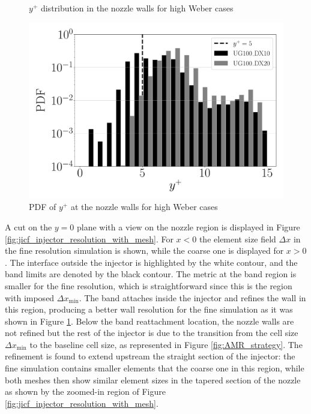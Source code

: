 \begin{figure}[ht]
\centering
{}
\caption{$y^+$ distribution in the nozzle walls for high Weber cases}
\label{fig:injector_visualization_y_plus}
\end{figure}

\begin{figure}[ht]
	\centering
   \includegraphics[scale=0.20]{./part2_developments/figures_ch5_resolved_JICF/instabilities_resolution/y_plus_injector}
   \vspace{-0.15in}
   \caption{PDF of $y^+$ at the nozzle walls for high Weber cases}
   \label{fig:jicf_nozzle_y_plus_PDF}
\end{figure}



A cut on the $y = 0$ plane with a view on the nozzle region is displayed in Figure \ref{fig:jicf_injector_resolution_with_mesh}.  For $x < 0$ the element size field $\Delta x$ in the fine resolution simulation is shown, while the coarse one is displayed for $x > 0$. The interface outside the injector is highlighted by the white contour, and the band limits are denoted by the black contour. The metric at the band region is smaller for the fine resolution, which is straightforward since this is the region with imposed $\Delta x_\mathrm{min}$. The band attaches inside the injector and refines the wall in this region, producing a better wall resolution for the fine simulation as it was shown in Figure \ref{fig:injector_visualization_y_plus}. Below the band reattachment location, the nozzle walls are not refined but the rest of the injector is due to the transition from the cell size $\Delta x_\mathrm{min}$ to the baseline cell size, as represented in Figure \ref{fig:AMR_strategy}. The refinement is found to extend upstream the straight section of the injector: the fine simulation contains smaller elements that the coarse one in this region, while both meshes then show similar element sizes in the tapered section of the nozzle as shown by the zoomed-in region of Figure \ref{fig:jicf_injector_resolution_with_mesh}.

